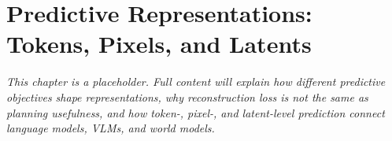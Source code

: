 \chapter{Predictive Representations: Tokens, Pixels, and Latents}
\label{ch:predictive-representations}


\textit{This chapter is a placeholder. Full content will explain how different predictive objectives shape representations, why reconstruction loss is not the same as planning usefulness, and how token-, pixel-, and latent-level prediction connect language models, VLMs, and world models.}
